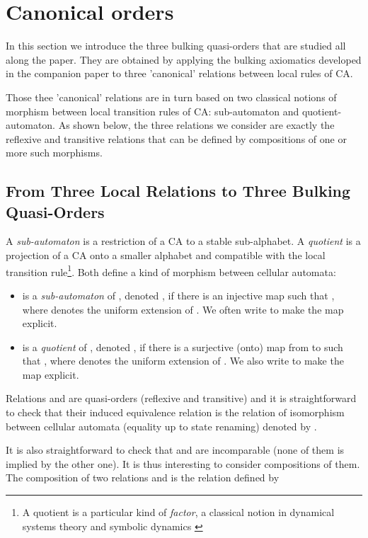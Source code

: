 \documentclass[a4paper]{elsarticle}
\begin{document}
\section{Canonical orders}
\label{sec:co}

In this section we introduce the three bulking quasi-orders that are
studied all along the paper. They are obtained by applying the bulking
axiomatics developed in the companion paper \cite{bulking1} to three
'canonical' relations between local rules of CA.

Those thee 'canonical' relations are in turn based on two classical
notions of morphism between local transition rules of CA:
sub-automaton and quotient-automaton. As shown below, the three
relations we consider are exactly the reflexive and transitive
relations that can be defined by compositions of one or more such
morphisms.


\subsection{From Three Local Relations to Three Bulking Quasi-Orders}
\label{sec:canondef}

A \emph{sub-automaton} is a restriction of a CA to a stable
sub-alphabet. A \emph{quotient} is a projection of a CA onto a smaller
alphabet and compatible with the local transition rule\footnote{A
  quotient is a particular kind of \emph{factor}, a classical notion
  in dynamical systems theory and symbolic dynamics \cite{kurkabook}}.
Both define a kind of morphism between cellular automata:

\begin{itemize}
\item  is a \emph{sub-automaton} of , denoted
  , if there is an injective map
   such that
  , where
   denotes the
  uniform extension of . We often write 
  to make the map  explicit.
    
\item  is a \emph{quotient} of , denoted ,
  if there is a surjective (onto) map  from  to 
  such that , where
   denotes the uniform
  extension of . We also write  to make the map
   explicit.
\end{itemize}

Relations  and  are quasi-orders (reflexive and
transitive) and it is straightforward to check that their induced
equivalence relation is the relation of isomorphism between cellular
automata (equality up to state renaming) denoted by .

It is also straightforward to check that  and  are
incomparable (none of them is implied by the other one). It is thus
interesting to consider compositions of them. The composition of two
relations  and  is the relation  defined by
\end{document}
